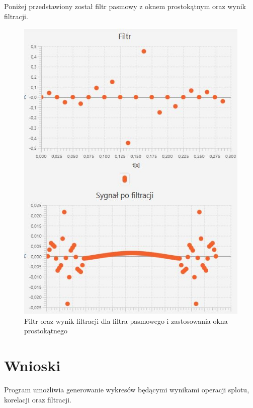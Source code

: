 \documentclass[12pt]{article}
\begin{document}
Poniżej przedstawiony został filtr pasmowy z oknem prostokątnym oraz wynik filtracji.
\begin{figure}[H]
	\centering
	\includegraphics[width=\linewidth]{filtr-pasmowy-prost}
	\caption{Filtr oraz wynik filtracji dla filtra pasmowego i zastosowania okna prostokątnego}
	\label{}
\end{figure}

\section{Wnioski}
Program umożliwia generowanie wykresów będącymi wynikami operacji splotu, korelacji oraz filtracji.
\end{document}
